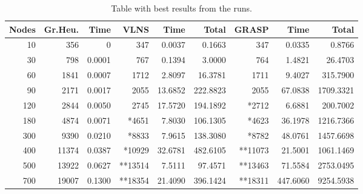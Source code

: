 \documentclass[a4paper]{scrartcl}
\begin{document}
\begin{table}
    \begin{adjustwidth}{-.5in}{-.5in}  
        \begin{center}
\begin{tabular}{r | r | r | r | r | r | r | r | r}
\hline
Nodes & Gr.Heu. & Time &  VLNS & Time & Total & GRASP & Time & Total \\
\hline \hline 
10 & 356 & 0 & 347 & 0.0037 & 0.1663 & 347 & 0.0335 & 0.8766 \\
\hline
30 & 798 & 0.0001 & 767 & 0.1394 & 3.0000 & 764 & 1.4821 & 26.4703 \\
\hline
60 & 1841 & 0.0007 & 1712 & 2.8097 & 16.3781 & 1711 & 9.4027 & 315.7900 \\
\hline
90 & 2171 & 0.0017 & 2055 & 13.6852 & 222.8823 & 2055 & 67.0838 & 1709.3321\\
\hline
120 & 2844 & 0.0050 & 2745 & 17.5720 & 194.1892 & *2712 & 6.6881 & 200.7002 \\
\hline
180 & 4874 & 0.0071 & *4651 & 7.8030 & 106.1305 & *4623 & 36.1978 & 1216.7366 \\
\hline
300 & 9390 & 0.0210 & *8833 & 7.9615 & 138.3080 & *8782 & 48.0761 & 1457.6698 \\
\hline
400 & 11374 & 0.0387 & *10929 & 32.6781 & 482.6105 & **11073 & 21.5001 & 1061.1469 \\
\hline
500 & 13922 & 0.0627 & **13514 & 7.5111 & 97.4571 & **13463 & 71.5584 & 2753.0495 \\
\hline
700 & 19007 & 0.1300 & **18354 & 21.4090 & 396.1424 & **18311 & 447.6060 & 9254.5938 \\
\hline
\end{tabular}

        \caption{Table with best results from the runs. }
        \label{myTable}
        \end{center}
    \end{adjustwidth}
\end{table}



\end{document}
